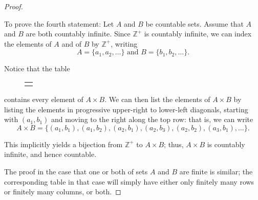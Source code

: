 \documentclass[10pt,]{book}
\theoremstyle{plain}
\theoremstyle{definition}
\theoremstyle{definition}
\theoremstyle{definition}
\theoremstyle{definition}
\numberwithin{equation}{section}
\newlength{\panelmax}
\def\Z{\mathbb{Z}}
\begin{document}
\begin{proof}\hypertarget{proof-4}{}

    To prove the fourth statement: Let \(A\) and \(B\) be countable sets. Assume that \(A\) and \(B\) are both countably infinite. Since \(\Z^+\) is countably infinite, we can index the elements of \(A\) and of \(B\) by \(\Z^+\), writing
\begin{equation*}
A=\{a_1,a_2,\ldots\} \text{ and }  B=\{b_1,b_2,\ldots\}.
\end{equation*}

\par

    Notice that the table
%
{%
\setlength{\panelmax}{0pt}
\newsavebox{\panelboxBtabular}
\newlength{\phBtabular}\setlength{\phBtabular}{\ht\panelboxBtabular+\dp\panelboxBtabular}
\settototalheight{\phBtabular}{\usebox{\panelboxBtabular}}
\setlength{\panelmax}{\maxof{\panelmax}{\phBtabular}}
\leavevmode%
\setlength{\tabcolsep}{0\textwidth}
\begin{figure}
\begin{tabular}{@{}*{1}{c}@{}}
\begin{minipage}[c][\panelmax][t]{1\textwidth}\usebox{\panelboxBtabular}\end{minipage}\end{tabular}
\end{figure}
}%
\par
contains every element of \(A\times B\). We can then list the elements of \(A\times B\) by listing the elements in progressive upper-right to lower-left diagonals, starting with \((a_1,b_1)\) and moving to the right along the top row: that is, we can write
\begin{equation*}
A\times B=\{(a_1,b_1),(a_1,b_2),(a_2,b_1),(a_2,b_3),(a_2,b_2),(a_3,b_1),\ldots\}.
\end{equation*}

\par

    This implicitly yields a bijection from \(\Z^+\) to \(A\times B\); thus, \(A\times B\) is countably infinite, and hence countable.
\par

    The proof in the case that one or both of sets \(A\) and \(B\) are finite is similar; the corresponding table in that case will simply have either only finitely many rows or finitely many columns, or both.
\end{proof}
\end{document}

